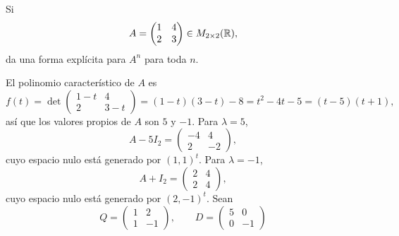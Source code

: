 \documentclass[12pt,a4paper]{article}
\begin{document}
    \begin{problema}
        Si
        \begin{equation*}
            A=
            \begin{pmatrix}
                1 & 4\\
                2 & 3
            \end{pmatrix}
            \in M_{2\times2}(\mathbb{R}),
        \end{equation*}
        da una forma explícita para $A^{n}$ para toda $n$.
    \end{problema}

    \begin{solucion}
        El polinomio característico de $A$ es
        \begin{equation*}
            f(t)=
            \det\begin{pmatrix}
                1-t & 4\\
                2 & 3-t
            \end{pmatrix}
            =(1-t)(3-t)-8=t^{2}-4t-5=(t-5)(t+1),
        \end{equation*}
        así que los valores propios de $A$ son $5$ y $-1$. Para $\lambda=5$,
        \begin{equation*}
            A-5I_{2}=
            \begin{pmatrix}
                -4 & 4\\
                2 & -2
            \end{pmatrix},
        \end{equation*}
        cuyo espacio nulo está generado por $(1,1)^{t}$. Para $\lambda=-1$,
        \begin{equation*}
            A+I_{2}=
            \begin{pmatrix}
                2 & 4\\
                2 & 4
            \end{pmatrix},
        \end{equation*}
        cuyo espacio nulo está generado por $(2,-1)^{t}$. Sean
        \begin{equation*}
            Q=
            \begin{pmatrix}
                1 & 2\\
                1 & -1
            \end{pmatrix},
            \qquad
            D=
            \begin{pmatrix}
                5 & 0\\
                0 & -1

\end{pmatrix}
\end{equation*}
\end{solucion}
\end{document}
